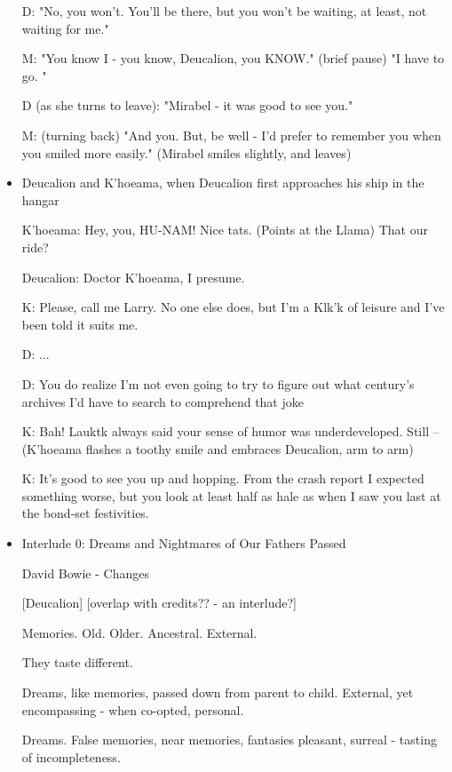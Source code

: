 \begin{itemize}
D: "No, you won't. You'll be there, but you won't be waiting, at least, not waiting for me."

M: "You know I - you know, Deucalion, you KNOW." (brief pause) "I have to go. "

D (as she turns to leave): "Mirabel - it was good to see you."

M: (turning back) "And you. But, be well - I'd prefer to remember you when you smiled more easily." (Mirabel smiles slightly, and leaves)

\item Deucalion and K'hoeama, when Deucalion first approaches his ship in the hangar

K'hoeama: Hey, you, HU-NAM! Nice tats. (Points at the Llama) That our ride?

Deucalion: Doctor K'hoeama, I presume.

K: Please, call me Larry. No one else does, but I'm a Klk'k of leisure and I've been told it suits me.

D: ...

D: You do realize I'm not even going to try to figure out what century's archives I'd have to search to comprehend that joke

K: Bah! Lauktk always said your sense of humor was underdeveloped. Still -- (K'hoeama flashes a toothy smile and embraces Deucalion, arm to arm) 

K: It's good to see you up and hopping. From the crash report I expected something worse, but you look at least half as hale as when I saw you last at the bond-set festivities. 

\item Interlude 0: Dreams and Nightmares of Our Fathers Passed

{}

\centerline{David Bowie - Changes}

[Deucalion] [overlap with credits?? - an interlude?]

Memories. Old. Older. Ancestral. External.

They taste different.

Dreams, like memories, passed down from parent to child. External, yet encompassing - when co-opted, personal.

Dreams. False memories, near memories, fantasies pleasant, surreal - tasting of incompleteness.


\end{itemize}
